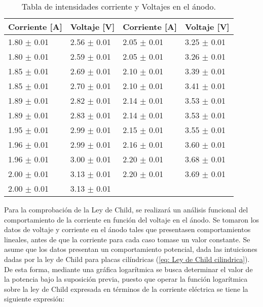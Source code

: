 \documentclass[%
 reprint,
 amsmath,amssymb,
 aps,
]{revtex4-2}
\begin{document}
\begin{table}[H]
    \centering
    \begin{tabular}{l|l||l|l}
        \toprule
        \toprule
        Corriente [A] & Voltaje [V] & Corriente [A] & Voltaje [V]\\
        \midrule
        1.80 $\pm$ 0.01  &  2.56 $\pm$ 0.01  & 2.05 $\pm$ 0.01  &  3.25 $\pm$ 0.01  \\
        1.80 $\pm$ 0.01  &  2.59 $\pm$ 0.01  & 2.05 $\pm$ 0.01  &  3.26 $\pm$ 0.01 \\
        1.85 $\pm$ 0.01  &  2.69 $\pm$ 0.01  & 2.10 $\pm$ 0.01  &  3.39 $\pm$ 0.01 \\
        1.85 $\pm$ 0.01  &  2.70 $\pm$ 0.01  & 2.10 $\pm$ 0.01  &  3.41 $\pm$ 0.01\\
        1.89 $\pm$ 0.01  &  2.82 $\pm$ 0.01  & 2.14 $\pm$ 0.01  &  3.53 $\pm$ 0.01 \\
        1.89 $\pm$ 0.01  &  2.83 $\pm$ 0.01  & 2.14 $\pm$ 0.01  &  3.53 $\pm$ 0.01 \\
        1.95 $\pm$ 0.01  &  2.99 $\pm$ 0.01  & 2.15 $\pm$ 0.01  &  3.55 $\pm$ 0.01\\
        1.96 $\pm$ 0.01  &  2.99 $\pm$ 0.01  & 2.16 $\pm$ 0.01  &  3.60 $\pm$ 0.01\\
        1.96 $\pm$ 0.01  &  3.00 $\pm$ 0.01  &  2.20 $\pm$ 0.01  &  3.68 $\pm$ 0.01 \\
        2.00 $\pm$ 0.01  &  3.13 $\pm$ 0.01  & 2.20 $\pm$ 0.01  &  3.69 $\pm$ 0.01  \\
        2.00 $\pm$ 0.01  &  3.13 $\pm$ 0.01  & & \\
        \bottomrule
        \bottomrule

    \end{tabular}
    \caption{Tabla de intensidades corriente y Voltajes en el ánodo.}
    \label{tab: V vs I filamento}
\end{table}

Para la comprobación de la Ley de Child, se realizará un análisis funcional del comportamiento de la corriente en función del voltaje en el ánodo. Se tomaron los datos de voltaje y corriente en el ánodo tales que presentasen comportamientos lineales, antes de que la corriente para cada caso tomase un valor constante. Se asume que los datos presentan un comportamiento potencial, dada las intuiciones dadas por la ley de Child para placas cilíndricas (\ref{eq: Ley de Child cilindrica}). De esta forma, mediante una gráfica logarítmica se busca determinar el valor de la potencia bajo la suposición previa, puesto que operar la función logarítmica sobre la ley de Child expresada en términos de la corriente eléctrica se tiene la siguiente expresión:
\end{document}
